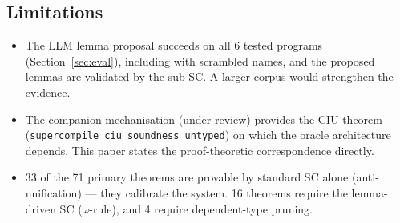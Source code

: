 \subsection{Limitations}

\begin{itemize}[leftmargin=*]
\item The LLM lemma proposal succeeds on all 6 tested programs
  (Section~\ref{sec:eval}), including with scrambled names, and the
  proposed lemmas are validated by the sub-SC.  A larger corpus
  would strengthen the evidence.

\item The companion mechanisation (under review) provides the CIU theorem
  (\texttt{supercompile\_ciu\_soundness\_untyped}) on which the oracle
  architecture depends.  This paper states the proof-theoretic correspondence
  directly.

\item 33 of the 71 primary theorems are provable by standard SC alone
  (anti-unification) --- they calibrate the system.  16 theorems require
  the lemma-driven SC ($\omega$-rule), and 4 require dependent-type
  pruning.
\end{itemize}
